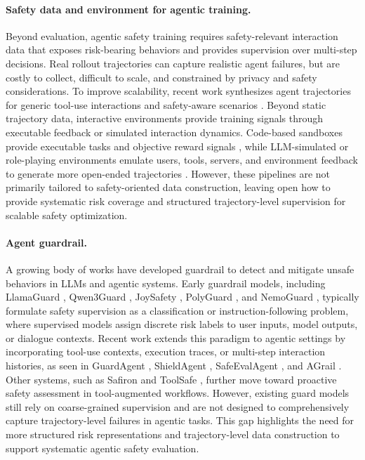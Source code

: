 \documentclass{llmxive}
\begin{document}
\paragraph{Safety data and environment for agentic training.} 
Beyond evaluation, agentic safety training requires safety-relevant interaction data that exposes risk-bearing behaviors and provides supervision over multi-step decisions. Real rollout trajectories can capture realistic agent failures, but are costly to collect, difficult to scale, and constrained by privacy and safety considerations. To improve scalability, recent work synthesizes agent trajectories for generic tool-use interactions \citep{li2025domain,toolace2025,kimi2025,auragen2025} and safety-aware scenarios \citep{xie-etal-2025-toolsafety,zhang2025agentalign,mou2026toolsafe}. Beyond static trajectory data, interactive environments provide training signals through executable feedback or simulated interaction dynamics. Code-based sandboxes provide executable tasks and objective reward signals \citep{wang2026agent,song2026envscaler,gao2026self,guo2025genenv}, while LLM-simulated or role-playing environments emulate users, tools, servers, and environment feedback to generate more open-ended trajectories \citep{li2025close,chen2025scaling,li2025simulating}. However, these pipelines are not primarily tailored to safety-oriented data construction, leaving open how to provide systematic risk coverage and structured trajectory-level supervision for scalable safety optimization.


\paragraph{Agent guardrail.} A growing body of works have developed guardrail to detect and mitigate unsafe behaviors in LLMs and agentic systems. Early guardrail models, including LlamaGuard \citep{inan2023llama}, Qwen3Guard \citep{qwen3guard2025}, JoySafety \citep{jd-opensource2025}, PolyGuard \citep{poliguard2025}, and NemoGuard \citep{nemo_guardrails2023}, typically formulate safety supervision as a classification or instruction-following problem, where supervised models assign discrete risk labels to user inputs, model outputs, or dialogue contexts. Recent work extends this paradigm to agentic settings by incorporating tool-use contexts, execution traces, or multi-step interaction histories, as seen in GuardAgent \citep{xiang2024guardagent}, ShieldAgent \citep{shieldagent2025}, SafeEvalAgent \citep{Wang2025safeevalagent}, and AGrail \citep{Luo2025agrail}. Other systems, such as Safiron \citep{huang2025building} and ToolSafe \citep{mou2026toolsafe}, further move toward proactive safety assessment in tool-augmented workflows. However, existing guard models still rely on coarse-grained supervision and are not designed to comprehensively capture trajectory-level failures in agentic tasks. This gap highlights the need for more structured risk representations and trajectory-level data construction to support systematic agentic safety evaluation.
\end{document}
